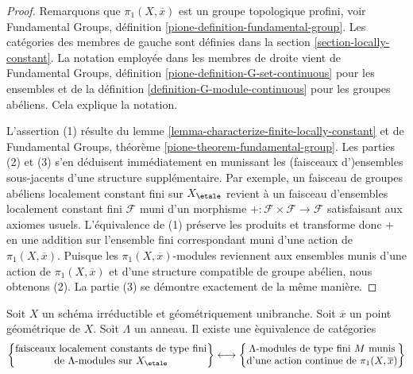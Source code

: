 \begin{proof}
Remarquons que $\pi_1(X, \overline{x})$ est un groupe topologique
profini, voir Fundamental Groups, définition
\ref{pione-definition-fundamental-group}.
Les cat\'egories des membres de gauche sont d\'efinies dans la
section \ref{section-locally-constant}.
La notation employ\'ee dans les membres de droite vient de
Fundamental Groups, définition \ref{pione-definition-G-set-continuous}
pour les ensembles et de la
d\'efinition \ref{definition-G-module-continuous} pour les groupes ab\'eliens.
Cela explique la notation.

\medskip\noindent
L'assertion (1) r\'esulte du
lemme \ref{lemma-characterize-finite-locally-constant}
et de Fundamental Groups, théorème \ref{pione-theorem-fundamental-group}.
Les parties (2) et (3) s'en d\'eduisent imm\'ediatement en munissant les
(faisceaux d')ensembles sous-jacents d'une structure suppl\'ementaire. Par exemple, un
faisceau de groupes ab\'eliens localement constant fini sur $X_\etale$ revient
\`a un faisceau d'ensembles localement constant fini $\mathcal{F}$
muni d'un morphisme $+ : \mathcal{F} \times \mathcal{F} \to \mathcal{F}$
satisfaisant aux axiomes usuels. L'\'equivalence de (1) pr\'eserve les produits
et transforme donc $+$ en une addition sur l'ensemble fini correspondant
muni d'une action de $\pi_1(X, \overline{x})$. Puisque les $\pi_1(X, \overline{x})$-modules
reviennent aux ensembles munis d'une action de $\pi_1(X, \overline{x})$ et d'une
structure compatible de groupe ab\'elien, nous obtenons (2). La partie (3) se d\'emontre
exactement de la m\^eme mani\`ere.
\end{proof}

\begin{lemma}
\label{lemma-locally-constant-on-connected-geom-unibranch}
Soit $X$ un sch\'ema irr\'eductible et g\'eom\'etriquement unibranche.
Soit $\overline{x}$ un point g\'eom\'etrique de $X$.
Soit $\Lambda$ un anneau. Il existe une \`equivalence de cat\'egories
$$
\left\{
\begin{matrix}
\text{faisceaux localement constants de type fini}\\
\text{de }\Lambda\text{-modules sur }X_\etale
\end{matrix}
\right\}
\longleftrightarrow
\left\{
\begin{matrix}
\Lambda\text{-modules de type fini }M\text{ munis}\\
\text{d'une action continue de }\pi_1(X, \overline{x})
\end{matrix}
\right\}
$$
\end{lemma}

